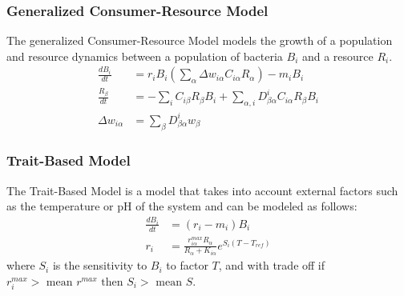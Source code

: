 \subsubsection{Generalized Consumer-Resource Model}
The generalized Consumer-Resource Model models the growth of a population and resource dynamics between a population of bacteria ${B}_i$ and a resource ${R}_i$. 
\begin{align}
    \frac{d{B}_i}{dt} &= r_i{B}_i \left(\sum_{\alpha} \Delta w_{i \alpha}C_{i \alpha}R_{\alpha}\right) - m_i {B}_i \\
    \frac{R_{\beta}}{dt} &= -\sum_i C_{i\beta}R_{\beta}{B_i} + \sum_{\alpha, i}D_{\beta\alpha}^{i}C_{i\alpha}R_{\beta}{B}_i \\
    \Delta w_{i\alpha} &= \sum_{\beta}D_{\beta \alpha}^{i}w_{\beta}
\end{align}

\subsubsection{Trait-Based Model}
The Trait-Based Model is a model that takes into account external factors such as the temperature or pH of the system and can be modeled as follows:  
\begin{align}
    \frac{dB_i}{dt} &= \left(r_i - m_i\right) B_i \\
    r_i &= \frac{r_{i\alpha}^{max}R_\alpha}{R_\alpha + K_{i\alpha}}e^{S_i\left(T-T_{ref}\right)}
\end{align}
where $S_i$ is the sensitivity to $B_i$ to factor $T$, and with trade off if $r_i^{max} > \text{ mean } r^{max} \text{ then } S_i > \text{ mean } S$. 

